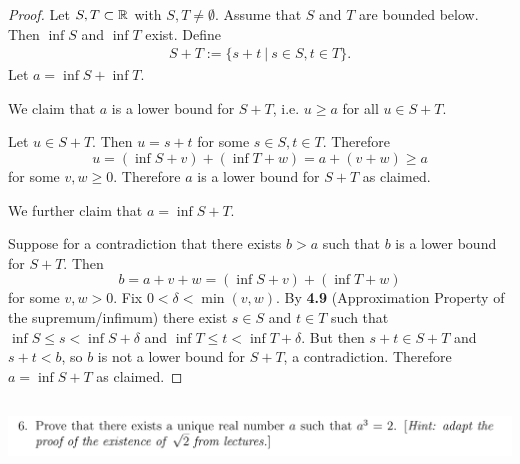 \documentclass[12pt]{article}
\begin{document}
\begin{proof}
  Let $S, T \subset \mathbb{R}$ with $S, T \neq \emptyset$. Assume that $S$ and $T$ are bounded
  below. Then $\inf S$ and $\inf T$ exist. Define
  \begin{align*}
    S + T := \{s + t ~|~ s \in S, t \in T\}.
  \end{align*}
  Let $a = \inf S + \inf T$.

  We claim that $a$ is a lower bound for $S + T$, i.e. $u \geq a$ for all $u \in S + T$.

  Let $u \in S + T$. Then $u = s + t$ for some $s \in S, t \in T$. Therefore
  $$u = (\inf S + v) + (\inf T + w) = a + (v + w) \geq a$$ for some $v, w \geq 0$. Therefore $a$ is
  a lower bound for $S + T$ as claimed.

  We further claim that $a = \inf S + T$.

  Suppose for a contradiction that there exists $b > a$ such that $b$ is a lower bound for
  $S + T$. Then $$b = a + v + w = (\inf S + v) + (\inf T + w)$$ for some $v, w > 0$. Fix
  $0 < \delta < \min(v, w)$. By {\bf 4.9} (Approximation Property of the supremum/infimum) there
  exist $s \in S$ and $t \in T$ such that $\inf S \leq s < \inf S + \delta$ and
  $\inf T \leq t < \inf T + \delta$. But then $s + t \in S + T$ and $s + t < b$, so $b$ is not a
  lower bound for $S + T$, a contradiction. Therefore $a = \inf S + T$ as claimed.
\end{proof}

\newpage
\subsection{}
\begin{mdframed}
  \includegraphics[width=400pt]{img/oxford-M2-analysis-I-2-6.png}
\end{mdframed}
\end{document}
